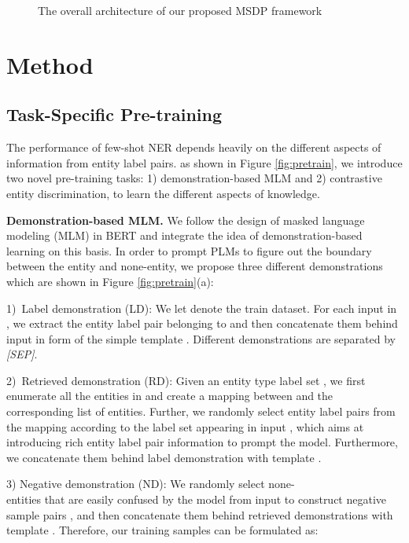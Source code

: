\documentclass[sigconf,natbib=true,anonymous=False]{acmart}
\begin{document}
\begin{figure*}
    \centering
{}
    \vspace{-0.2cm}
    \caption{The overall architecture of our proposed MSDP framework}
    \label{fig:main}
\end{figure*}


\section{Method}

\subsection{Task-Specific Pre-training}
The performance of few-shot NER depends heavily on the different aspects of information from entity label pairs. as shown in Figure \ref{fig:pretrain}, we introduce two novel pre-training tasks: 1) demonstration-based MLM and 2) contrastive entity discrimination, to learn the different aspects of knowledge.

\textbf{Demonstration-based MLM.} We follow the design of masked language modeling (MLM) in BERT \cite{devlin2018bert} and integrate the idea of demonstration-based learning on this basis. In order to prompt PLMs to figure out the boundary between the entity and none-entity, we propose three different demonstrations which are shown in Figure \ref{fig:pretrain}(a):

1)~Label demonstration (LD): We let   denote the train dataset. For each input  in , we extract the entity label pair  belonging to  and then concatenate them behind input  in form of the simple template . Different demonstrations are separated by \emph{[SEP]}.

2)~Retrieved demonstration (RD): Given an entity type label set , we first enumerate all the entities in  and create a mapping  between  and the corresponding list of entities. Further, we randomly select  entity label pairs  from the mapping  according to the label set  appearing in input , which aims at introducing rich entity label pair information to prompt the model. Furthermore, we concatenate them behind label demonstration with template .

3) Negative demonstration (ND):  We randomly select  none-\\entities that are easily confused by the model from input  to construct negative sample pairs , and then concatenate them behind retrieved demonstrations with template . Therefore, our training samples can be formulated as:
\end{document}
